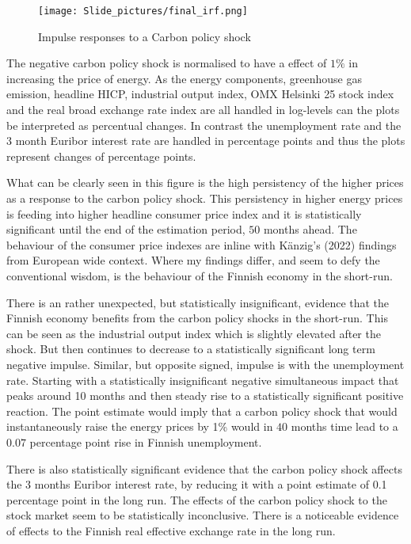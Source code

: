 \documentclass[
  12pt,
  a4paper,
]{report}
\begin{document}
\begin{figure}
\centering
\texttt{[image: Slide\_pictures/final\_irf.png]}
\caption{Impulse responses to a Carbon policy shock}
\end{figure}

The negative carbon policy shock is normalised to have a effect of \(1\%\) in increasing the price of energy. As the energy components, greenhouse gas emission, headline HICP, industrial output index, OMX Helsinki 25 stock index and the real broad exchange rate index are all handled in log-levels can the plots be interpreted as percentual changes. In contrast the unemployment rate and the 3 month Euribor interest rate are handled in percentage points and thus the plots represent changes of percentage points.

What can be clearly seen in this figure is the high persistency of the higher prices as a response to the carbon policy shock. This persistency in higher energy prices is feeding into higher headline consumer price index and it is statistically significant until the end of the estimation period, \(50\) months ahead. The behaviour of the consumer price indexes are inline with Känzig's (2022) findings from European wide context. Where my findings differ, and seem to defy the conventional wisdom, is the behaviour of the Finnish economy in the short-run.

There is an rather unexpected, but statistically insignificant, evidence that the Finnish economy benefits from the carbon policy shocks in the short-run. This can be seen as the industrial output index which is slightly elevated after the shock. But then continues to decrease to a statistically significant long term negative impulse. Similar, but opposite signed, impulse is with the unemployment rate. Starting with a statistically insignificant negative simultaneous impact that peaks around 10 months and then steady rise to a statistically significant positive reaction. The point estimate would imply that a carbon policy shock that would instantaneously raise the energy prices by 1\% would in \(40\) months time lead to a \(0.07\) percentage point rise in Finnish unemployment.

There is also statistically significant evidence that the carbon policy shock affects the 3 months Euribor interest rate, by reducing it with a point estimate of 0.1 percentage point in the long run. The effects of the carbon policy shock to the stock market seem to be statistically inconclusive. There is a noticeable evidence of effects to the Finnish real effective exchange rate in the long run.
\end{document}
